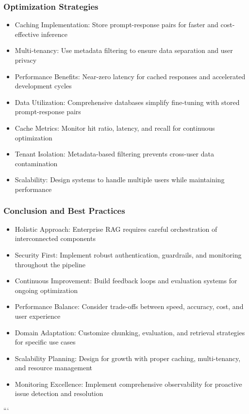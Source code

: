 \begin{frame}[fragile]\frametitle{Optimization Strategies}
      \begin{itemize}
        \item Caching Implementation: Store prompt-response pairs for faster and cost-effective inference
        \item Multi-tenancy: Use metadata filtering to ensure data separation and user privacy
        \item Performance Benefits: Near-zero latency for cached responses and accelerated development cycles
        \item Data Utilization: Comprehensive databases simplify fine-tuning with stored prompt-response pairs
        \item Cache Metrics: Monitor hit ratio, latency, and recall for continuous optimization
        \item Tenant Isolation: Metadata-based filtering prevents cross-user data contamination
        \item Scalability: Design systems to handle multiple users while maintaining performance
      \end{itemize}
\end{frame}

\begin{frame}[fragile]\frametitle{Conclusion and Best Practices}
      \begin{itemize}
        \item Holistic Approach: Enterprise RAG requires careful orchestration of interconnected components
        \item Security First: Implement robust authentication, guardrails, and monitoring throughout the pipeline
        \item Continuous Improvement: Build feedback loops and evaluation systems for ongoing optimization
        \item Performance Balance: Consider trade-offs between speed, accuracy, cost, and user experience
        \item Domain Adaptation: Customize chunking, evaluation, and retrieval strategies for specific use cases
        \item Scalability Planning: Design for growth with proper caching, multi-tenancy, and resource management
        \item Monitoring Excellence: Implement comprehensive observability for proactive issue detection and resolution
      \end{itemize}
\end{frame}
```